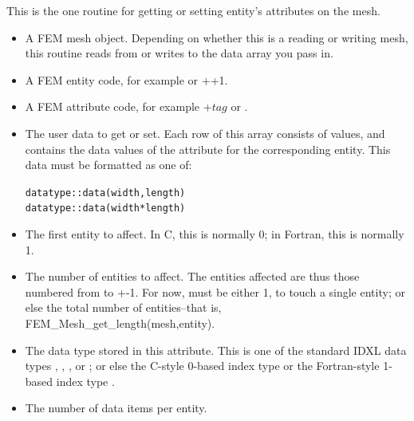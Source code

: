 
This is the one routine for getting or setting entity's attributes 
on the mesh.  

\begin{itemize}
\item {} A FEM mesh object.  Depending on whether this is
   a reading or writing mesh, this routine reads from or writes to
   the data array you pass in.

\item {} A FEM entity code, for example  or
   ++1.

\item {} A FEM attribute code, for example +$tag$
   or .  
 
\item {} The user data to get or set.  Each row of this array consists
  of  values, and contains the data values of the attribute for the
  corresponding entity.  This data must be formatted as one of:
  \begin{alltt}
      datatype :: data(width,length)
      datatype :: data(width*length)
  \end{alltt}

\item {} The first entity to affect.  In C, this is normally 0;
  in Fortran, this is normally 1.

\item {} The number of entities to affect.  The entities
  affected are thus those numbered from  to +-1.
  For now,  must be either 1, to touch a single entity; or
  else the total number of entities--that is, FEM\_Mesh\_get\_length(mesh,entity).

\item {} The data type stored in this attribute.  This
  is one of the standard IDXL data types , , 
  , or ; or else the C-style 0-based
  index type  or the Fortran-style 1-based index type
  .

\item {} The number of data items per entity. 

\end{itemize}

